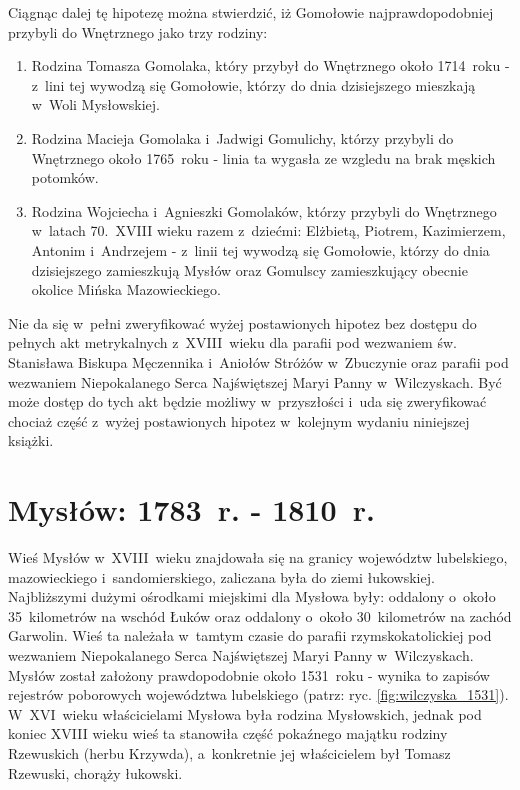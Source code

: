 Ciągnąc dalej tę hipotezę można stwierdzić, iż Gomołowie najprawdopodobniej 
przybyli do Wnętrznego jako trzy rodziny:

\begin{enumerate}
    \item Rodzina Tomasza Gomolaka, który przybył do Wnętrznego około 
    1714~roku - z~lini tej wywodzą się Gomołowie, którzy do dnia dzisiejszego 
    mieszkają w~Woli Mysłowskiej.
    \item Rodzina Macieja Gomolaka i~Jadwigi Gomulichy, którzy przybyli do 
    Wnętrznego około 1765~roku - linia ta wygasła ze wzgledu na brak 
    męskich potomków.
    \item Rodzina Wojciecha i~Agnieszki Gomolaków, którzy przybyli do 
    Wnętrznego w~latach 70.~XVIII wieku razem z~dziećmi: Elżbietą, Piotrem,
    Kazimierzem, Antonim i~Andrzejem - z~linii tej wywodzą się Gomołowie, 
    którzy do dnia dzisiejszego zamieszkują Mysłów oraz Gomulscy 
    zamieszkujący obecnie okolice Mińska Mazowieckiego.
\end{enumerate}

Nie da się w~pełni zweryfikować wyżej postawionych hipotez bez dostępu do 
pełnych akt metrykalnych z~XVIII~wieku dla parafii pod wezwaniem św. 
Stanisława Biskupa Męczennika i~Aniołów Stróżów w~Zbuczynie oraz parafii pod 
wezwaniem Niepokalanego Serca Najświętszej Maryi Panny w~Wilczyskach. Być może 
dostęp do tych akt będzie możliwy w~przyszłości i~uda się zweryfikować chociaż 
część z~wyżej postawionych hipotez w~kolejnym wydaniu niniejszej książki.

\newpage
\ifodd\value{page}\hbox{}\newpage\fi



\section{Mysłów: 1783~r. - 1810~r.}

Wieś Mysłów w~XVIII~wieku znajdowała się na granicy województw lubelskiego, 
mazowieckiego i~sandomierskiego, zaliczana była do ziemi łukowskiej. 
Najbliższymi dużymi ośrodkami miejskimi dla Mysłowa były: oddalony 
o~około 35~kilometrów na wschód Łuków oraz oddalony o~około 30~kilometrów na 
zachód Garwolin. Wieś ta należała w~tamtym czasie do parafii 
rzymskokatolickiej pod wezwaniem Niepokalanego Serca Najświętszej Maryi Panny 
w~Wilczyskach. Mysłów został założony prawdopodobnie około 1531~roku - wynika 
to zapisów rejestrów poborowych województwa lubelskiego \cite{apawinski} 
(patrz: ryc. \ref{fig:wilczyska_1531}). W~XVI~wieku właścicielami Mysłowa 
była rodzina Mysłowskich, jednak pod koniec XVIII wieku wieś ta stanowiła 
część pokaźnego majątku rodziny Rzewuskich (herbu Krzywda), a~konkretnie jej 
właścicielem był Tomasz Rzewuski, chorąży łukowski. \nocite{sulimierski}

